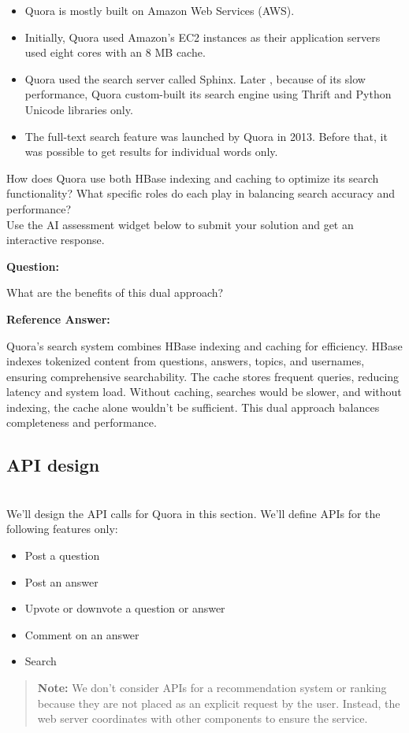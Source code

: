 \begin{itemize}
\tightlist
\item
Quora is mostly built on Amazon Web Services (AWS).
\item
Initially, Quora used Amazon's EC2 instances as their application servers used eight cores with an 8 MB cache.
\item
Quora used the search server called Sphinx. Later , because of its slow performance, Quora custom-built its search engine using Thrift and Python Unicode libraries only.
\item
The full-text search feature was launched by Quora in 2013. Before that, it was possible to get results for individual words only.
\end{itemize}

How does Quora use both HBase indexing and caching to optimize its search functionality? What specific roles do each play in balancing search accuracy and performance?
\\
Use the AI assessment widget below to submit your solution and get an interactive response.

\textbf{Question:}

What are the benefits of this dual approach?

\textbf{Reference Answer:}

Quora's search system combines HBase indexing and caching for efficiency. HBase indexes tokenized content from questions, answers, topics, and usernames, ensuring comprehensive searchability. The cache stores frequent queries, reducing latency and system load. Without caching, searches would be slower, and without indexing, the cache alone wouldn't be sufficient. This dual approach balances completeness and performance.

\subsection{API design}\label{-EIG-XU7OiH8au0G-o0H1}
\\
We'll design the API calls for Quora in this section. We'll define APIs for the following features only:

\begin{itemize}
\item
\protect{}\label{PKgKVCS0_Ls3dlx7q3U6a}
Post a question
\item
\protect{}\label{nKCh4DqGYsc8DRuHLZMb2}
Post an answer
\item
\protect{}\label{VXMPp2ofFKoANTUE6em95}
Upvote or downvote a question or answer
\item
\protect{}\label{kssHnnc_ZwA-I9rdOQySN}
Comment on an answer
\item
\protect{}\label{ZK38z2jRh3ed0lDWLB7Lr}
Search
\end{itemize}
\begin{quote}
\textbf{Note:} We don't consider APIs for a recommendation system or ranking because they are not placed as an explicit request by the user. Instead, the web server coordinates with other components to ensure the service.
\end{quote}
